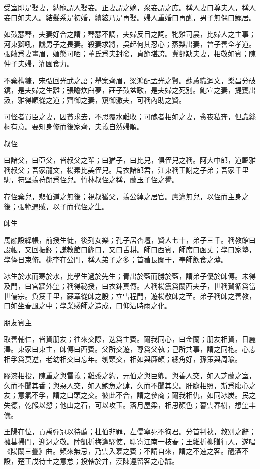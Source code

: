 \documentclass[12pt,a4paper]{ctexbook}
\begin{document}
受室即是娶妻，納寵謂人娶妾。正妻謂之嫡，衆妾謂之庶。稱人妻曰尊夫人，稱人妾曰如夫人。結髮系是初婚，續絃乃是再娶。婦人重婚曰再醮，男子無偶曰鰥居。\par
如鼓瑟琴，夫妻好合之謂；琴瑟不調，夫婦反目之詞。牝雞司晨，比婦人之主事；河東獅吼，譏男子之畏妻。殺妻求將，吳起何其忍心；蒸梨出妻，曾子善全孝道。張敞爲妻畫眉，媚態可哂；董氏爲夫封發，貞節堪誇。冀郤缺夫妻，相敬如賓；陳仲子夫婦，灌園食力。\par
不棄槽糠，宋弘回光武之語；舉案齊眉，梁鴻配孟光之賢。蘇蕙織迴文，樂昌分破鏡，是夫婦之生離；張瞻炊臼夢，莊子鼓盆歌，是夫婦之死別。鮑宣之妻，提甕出汲，雅得順從之道；齊御之妻，窺御激夫，可稱內助之賢。\par
可怪者買臣之妻，因貧求去，不思覆水難收；可醜者相如之妻，夤夜私奔，但識絲桐有意。要知身修而後家齊，夫義自然婦順。\par
叔侄\par
曰諸父，曰亞父，皆叔父之輩；曰猶子，曰比兒，俱侄兒之稱。阿大中郎，道韞雅稱叔父；吾家龍文，楊素比美侄兒。烏衣諸郎君，江東稱王謝之子弟；吾家千里駒，符堅羨苻朗爲侄兒。竹林叔侄之稱，蘭玉子侄之譽。\par
存侄棄兒，悲伯道之無後；視叔猶父，羨公綽之居官。盧邁無兒，以侄而主身之後；張範遇賊，以子而代侄之生。\par
師生\par
馬融設絳帳，前授生徒，後列女樂；孔子居杏壇，賢人七十，弟子三千。稱教館曰設帳，又回振鐸；謙教館曰餬口，又曰舌耕。師曰西賓，師席曰函丈；學曰家塾，學俸日束脩。桃李在公門，稱人弟子之多；首蓿長闌干，奉師飲食之薄。\par
冰生於水而寒於水，比學生過於先生；青出於藍而勝於藍，謂弟子優於師傅。未得及門，曰宮牆外望；稱得祕授，曰衣鉢真傳。人稱楊震爲關西夫子，世稱賀循爲當世儒宗。負笈千里，蘇章從師之殷；立雪程門，遊楊敬師之至。弟子稱師之善教，曰如坐春風之中；學業感師之造成，曰仰沾時雨之化。\par
朋友賓主\par
取善輔仁，皆資朋友；往來交際，迭爲主賓。爾我同心，曰金蘭；朋友相資，日麗澤。東家曰東主，師傅曰西賓。父所交遊，尊爲父執；己所共事，謂之同袍。心志相孚爲莫逆，老幼相交曰忘年。刎頸交，相如與廉頗；總角好，孫策與周瑜。\par
膠漆相投，陳重之與雷義；雞黍之約，元伯之與巨卿。與善人交，如入芝蘭之室，久而不聞其香；與惡人交，如入鮑魚之肆，久而不聞其臭。肝膽相照，斯爲腹心之友；意氣不孚，謂之口頭之交。彼此不合，謂之參商；爾我相仇，如同冰炭。民之失德，乾餱以愆；他山之石，可以攻玉。落月屋梁，相思顏色；暮雲春樹，想望丰儀。\par
王陽在位，貢禹彈冠以待薦；杜伯非罪，左儒寧死不徇君。分首判袂，敘別之辭；擁彗掃門，迎迓之敬。陸凱折梅逢驛使，聊寄江南一枝春；王維折柳贈行人，遂唱《陽關三疊》曲。頻來無忌，乃雲入慕之賓；不請自來，謂之不速之客。醴酒不設，楚王戊待土之意怠；投轄於井，漢陳遵留客之心誠。\par
\end{document}
